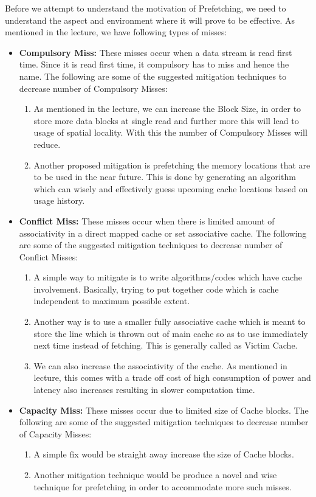 \documentclass[12pt]{article}
\begin{document}
Before we attempt to understand the motivation of Prefetching, we need to understand the aspect and environment where it will prove to be effective. As mentioned in the lecture, we have following types of misses: 
\begin{itemize}
    \item \textbf{Compulsory Miss:}
    These misses occur when a data stream is read first time. Since it is read first time, it compulsory has to miss and hence the name. The following are some of the suggested mitigation techniques to decrease number of Compulsory Misses:
    \begin{enumerate}
        \item As mentioned in the lecture, we can increase the Block Size, in order to store more data blocks at single read and further more this will lead to usage of spatial locality. With this the number of Compulsory Misses will reduce.
        \item Another proposed mitigation is prefetching the memory locations that are to be used in the near future. This is done by generating an algorithm which can wisely and effectively guess upcoming cache locations based on usage history.
    \end{enumerate}
    \item \textbf{Conflict Miss:} 
    These misses occur when there is limited amount of associativity in a direct mapped cache or set associative cache. The following are some of the suggested mitigation techniques to decrease number of Conflict  Misses: 
    \begin{enumerate}
        \item A simple way to mitigate is to write algorithms/codes which have cache involvement. Basically, trying to put together code which is cache independent to maximum possible extent.
        \item Another way is to use a smaller fully associative cache which is meant to store the line which is thrown out of main cache so as to use immediately next time instead of fetching. This is generally called as Victim Cache.
        \item We can also increase the associativity of the cache. As mentioned in lecture, this comes with a trade off cost of high consumption of power and latency also increases resulting in slower computation time.
    \end{enumerate}
    \item \textbf{Capacity Miss:}
    These misses occur due to limited size of Cache blocks. The following are some of the suggested mitigation techniques to decrease number of Capacity  Misses: 
    \begin{enumerate}
        \item A simple fix would be straight away increase the size of Cache blocks.
        \item Another mitigation technique would be produce a novel and wise technique for prefetching in order to accommodate more such misses.
    \end{enumerate}
\end{itemize}
\end{document}
